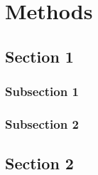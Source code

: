 
\chapter{Methods} %

\label{Methods} %


\section{Section 1}

\subsection{Subsection 1}



\subsection{Subsection 2}


\section{Section 2}

